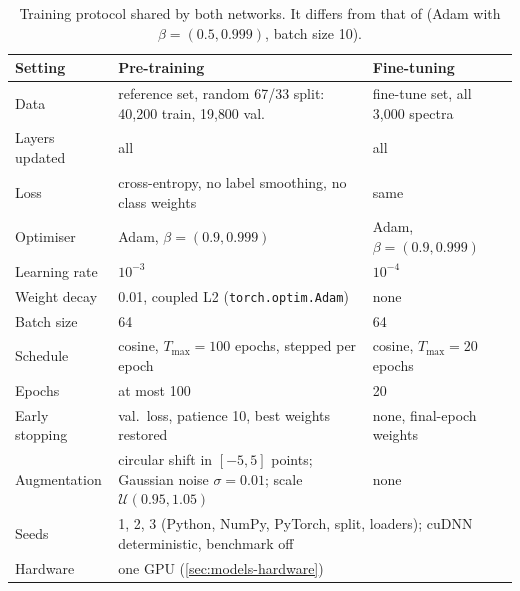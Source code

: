 \documentclass[journal,onecolumn]{IEEEtran}
\begin{document}
\begin{table}[!t]
  \centering
  \caption{Training protocol shared by both networks. It differs from that
  of \cite{ho2019bacteriaid} (Adam with $\beta=(0.5,0.999)$, batch size 10).}
  \label{tab:hparams}
  \begin{tabular}{@{}l p{6.6cm} p{5.0cm}@{}}
    \toprule
    Setting & Pre-training & Fine-tuning \\
    \midrule
    Data & reference set, random 67/33 split: 40{,}200 train, 19{,}800 val. & fine-tune set, all 3{,}000 spectra \\
    Layers updated & all & all \\
    Loss & cross-entropy, no label smoothing, no class weights & same \\
    Optimiser & Adam, $\beta=(0.9,0.999)$ & Adam, $\beta=(0.9,0.999)$ \\
    Learning rate & $10^{-3}$ & $10^{-4}$ \\
    Weight decay & 0.01, coupled L2 (\texttt{torch.optim.Adam}) & none \\
    Batch size & 64 & 64 \\
    Schedule & cosine, $T_{\max}=100$ epochs, stepped per epoch & cosine, $T_{\max}=20$ epochs \\
    Epochs & at most 100 & 20 \\
    Early stopping & val.\ loss, patience 10, best weights restored & none, final-epoch weights \\
    Augmentation & circular shift in $[-5,5]$ points; Gaussian noise $\sigma=0.01$; scale $\mathcal{U}(0.95,1.05)$ & none \\
    \midrule
    Seeds & \multicolumn{2}{l}{1, 2, 3 (Python, NumPy, PyTorch, split, loaders); cuDNN deterministic, benchmark off} \\
    Hardware & \multicolumn{2}{l}{one GPU (\cref{sec:models-hardware})} \\
    \bottomrule
  \end{tabular}
\end{table}
\end{document}
